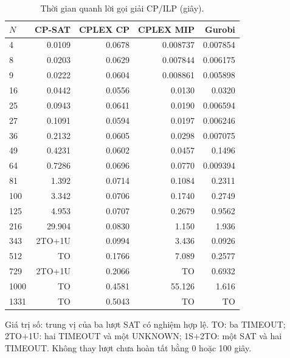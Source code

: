 \begin{table}[pos=H]
\centering
\small
\caption{Thời gian quanh lời gọi giải CP/ILP (giây).}
\label{tab:native_solve}
\setlength{\tabcolsep}{4pt}
\begin{tabular}{@{}lrrrr@{}}
\toprule
$N$ & CP-SAT & CPLEX CP & CPLEX MIP & Gurobi \\
\midrule
4 & 0.0109 & 0.0678 & 0.008737 & 0.007854 \\
8 & 0.0203 & 0.0629 & 0.007844 & 0.006175 \\
9 & 0.0222 & 0.0604 & 0.008861 & 0.005898 \\
16 & 0.0442 & 0.0556 & 0.0130 & 0.0320 \\
25 & 0.0943 & 0.0641 & 0.0190 & 0.006594 \\
27 & 0.1091 & 0.0594 & 0.0197 & 0.006246 \\
36 & 0.2132 & 0.0605 & 0.0298 & 0.007075 \\
49 & 0.4231 & 0.0602 & 0.0457 & 0.1496 \\
64 & 0.7286 & 0.0696 & 0.0770 & 0.009394 \\
81 & 1.392 & 0.0714 & 0.1084 & 0.2311 \\
100 & 3.342 & 0.0706 & 0.1740 & 0.2749 \\
125 & 4.953 & 0.0707 & 0.2679 & 0.9562 \\
216 & 29.904 & 0.0830 & 1.150 & 1.936 \\
343 & 2TO+1U & 0.0994 & 3.436 & 0.0926 \\
512 & TO & 0.1766 & 7.089 & 0.2577 \\
729 & 2TO+1U & 0.2066 & TO & 0.6932 \\
1000 & TO & 0.4581 & 55.126 & 1.616 \\
1331 & TO & 0.5043 & TO & TO \\
\bottomrule
\end{tabular}
\par\smallskip\begin{minipage}{\linewidth}\footnotesize Giá trị số: trung vị của ba lượt SAT có nghiệm hợp lệ. TO: ba TIMEOUT; 2TO+1U: hai TIMEOUT và một UNKNOWN; 1S+2TO: một SAT và hai TIMEOUT. Không thay lượt chưa hoàn tất bằng 0 hoặc 100 giây.\end{minipage}
\end{table}
